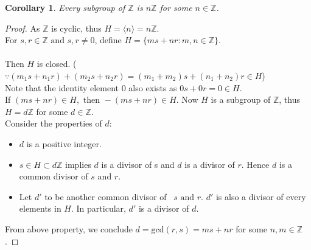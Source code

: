 \documentclass{article}
\theoremstyle{MyNonumberplain}
\theoremstyle{break}
\newtheorem*{proof}{Proof. }
\newcommand{\Z}{\mathbb{Z}}
\newcommand{\cyclic}[1]{\langle #1 \rangle}
\newcommand{\infixand}{\text{ and }}
\theoremstyle{break}
\newtheorem{corollary}{Corollary}[theorem]
\theoremstyle{break}
\theoremstyle{definition}
\theoremstyle{break}
\begin{document}
\begin{thmbox}
    \begin{corollary}
        Every subgroup of $\Z$ is $n\Z$ for some $n\in\Z$.
    \end{corollary}
    \begin{prfbox}
        \begin{proof}
            As $\mathbb{Z}$ is cyclic, thus $H = \cyclic{n} = n\mathbb{Z}$.\\
    
            For $s, r \in \mathbb{Z} \infixand s, r \neq 0$, define $H = \{ m s + n r : m,n \in \mathbb{Z} \}$.\\\\
            Then $H$ is closed. ($\because (m_1 s + n_1 r) + (m_2 s + n_2 r) = (m_1 + m_2) s + (n_1 + n_2) r
            \in H$)\\
    
            Note that the identity element 0 also exists as $0 s + 0 r = 0 \in H$.\\
    
            If $(m s + n r) \in H, \text{ then } - (m s + n r) \in H$. Now $H$ is a
            subgroup of $\mathbb{Z}$, thus $H = d\mathbb{Z}$ for some $d \in \mathbb{Z}$.\\
    
            Consider the properties of $d$:\\
            \begin{itemize}
            \item $d$ is a positive integer.\\
            
            \item $s \in H \subset d\mathbb{Z}$ implies $d$ is a divisor of s and $d$ is
            a divisor of $r$. Hence $d$ is a common divisor of $s$ and $r$.\\
            
            \item Let $d'$ to be another common divisor of \ $s \infixand r$. $d'$ is
            also a divisor of every elements in $H$. In particular, $d'$ is a divisor of $d$.\\
            \end{itemize}
            From above property, we conclude $d = \text{gcd} (r, s) = m s + n r$ for
            some $n, m \in \mathbb{Z}$.
        \end{proof}
    \end{prfbox}
\end{thmbox}
\end{document}
